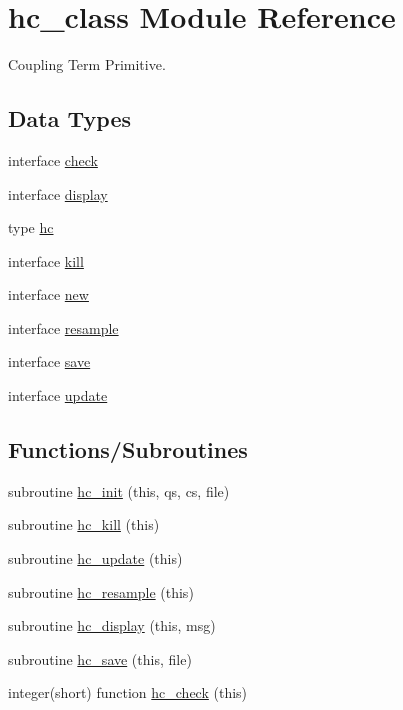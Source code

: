 \hypertarget{namespacehc__class}{}\section{hc\+\_\+class Module Reference}
\label{namespacehc__class}


Coupling Term Primitive.  


\subsection*{Data Types}
\begin{DoxyCompactItemize}
\item 
interface \hyperlink{interfacehc__class_1_1check}{check}
\item 
interface \hyperlink{interfacehc__class_1_1display}{display}
\item 
type \hyperlink{structhc__class_1_1hc}{hc}
\item 
interface \hyperlink{interfacehc__class_1_1kill}{kill}
\item 
interface \hyperlink{interfacehc__class_1_1new}{new}
\item 
interface \hyperlink{interfacehc__class_1_1resample}{resample}
\item 
interface \hyperlink{interfacehc__class_1_1save}{save}
\item 
interface \hyperlink{interfacehc__class_1_1update}{update}
\end{DoxyCompactItemize}
\subsection*{Functions/\+Subroutines}
\begin{DoxyCompactItemize}
\item 
subroutine \hyperlink{namespacehc__class_a6a95655090afaac2c5f7b049c3919597}{hc\+\_\+init} (this, qs, cs, file)
\item 
subroutine \hyperlink{namespacehc__class_a72759d56fe1bbe360bfe0efaae62b6a6}{hc\+\_\+kill} (this)
\item 
subroutine \hyperlink{namespacehc__class_a5b4008b35ac8a501909a4b9aed8fcd71}{hc\+\_\+update} (this)
\item 
subroutine \hyperlink{namespacehc__class_a1b4a0d9a46c63f538c74670dca5fdc82}{hc\+\_\+resample} (this)
\item 
subroutine \hyperlink{namespacehc__class_a484af233bb8b65db73534ae297fa7346}{hc\+\_\+display} (this, msg)
\item 
subroutine \hyperlink{namespacehc__class_ac1fbe6abcc3415c55bd2b920cbb47234}{hc\+\_\+save} (this, file)
\item 
integer(short) function \hyperlink{namespacehc__class_ad0b55c92720ef59cfd8b4cecd194afe1}{hc\+\_\+check} (this)
\end{DoxyCompactItemize}


